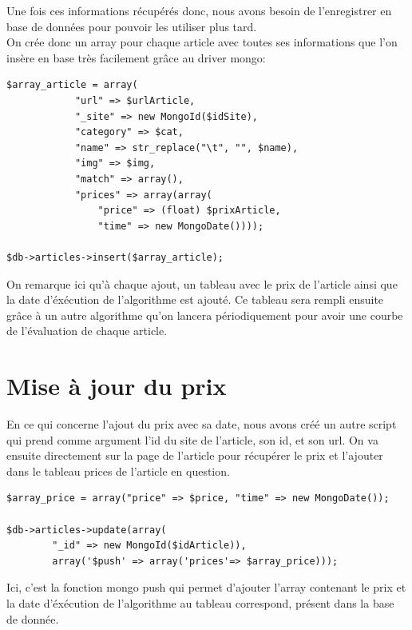 \documentclass{report}
\begin{document}
Une fois ces informations récupérés donc, nous avons besoin de l'enregistrer en base de données pour pouvoir les utiliser plus tard.\\
On crée donc un array pour chaque article avec toutes ses informations que l'on insère en base très facilement grâce au driver mongo:\\
\begin{lstlisting}
$array_article = array(
			"url" => $urlArticle,
			"_site" => new MongoId($idSite),
			"category" => $cat,
			"name" => str_replace("\t", "", $name),
			"img" => $img,
			"match" => array(),
			"prices" => array(array(
				"price" => (float) $prixArticle,
				"time" => new MongoDate())));
			
$db->articles->insert($array_article);
\end{lstlisting}

On remarque ici qu'à chaque ajout, un tableau avec le prix de l'article ainsi que la date d'éxécution de l'algorithme est ajouté. Ce tableau sera rempli ensuite grâce à un autre algorithme qu'on lancera périodiquement pour avoir une courbe de l'évaluation de chaque article.

\section{Mise à jour du prix}
En ce qui concerne l'ajout du prix avec sa date, nous avons créé un autre script qui prend comme argument l'id du site de l'article, son id, et son url. On va ensuite directement sur la page de l'article pour récupérer le prix et l'ajouter dans le tableau prices de l'article en question.
\begin{lstlisting}
$array_price = array("price" => $price, "time" => new MongoDate());

$db->articles->update(array(
		"_id" => new MongoId($idArticle)),
		array('$push' => array('prices'=> $array_price)));
\end{lstlisting}
Ici, c'est la fonction mongo push qui permet d'ajouter l'array contenant le prix et la date d'éxécution de l'algorithme au tableau correspond, présent dans la base de donnée.
\newpage
\end{document}
